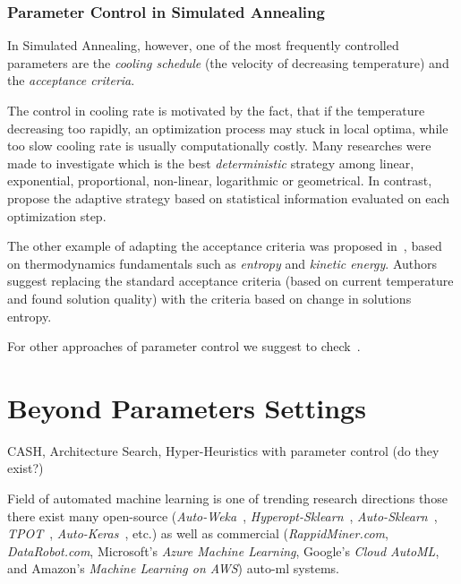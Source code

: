 \subsubsection{Parameter Control in Simulated Annealing}\label{bg: parameter control: SA}
In Simulated Annealing, however, one of the most frequently controlled parameters are the \textit{cooling schedule} (the velocity of decreasing temperature) and the \textit{acceptance criteria}.

The control in cooling rate is motivated by the fact, that if the temperature decreasing too rapidly, an optimization process may stuck in local optima, while too slow cooling rate is usually computationally costly. Many researches were made to investigate which is the best \textit{deterministic} strategy among linear, exponential, proportional, non-linear, logarithmic or geometrical. In contrast, \cite{karabin2020simulated} propose the adaptive strategy based on statistical information evaluated on each optimization step.

The other example of adapting the acceptance criteria was proposed in~\cite{ghandeshtani2019entropy}, based on thermodynamics fundamentals such as \textit{entropy} and \textit{kinetic energy}. Authors suggest replacing the standard acceptance criteria (based on current temperature and found solution quality) with the criteria based on change in solutions entropy.

For other approaches of parameter control we suggest to check~\cite{ingber2000adaptive,de2003placement}.

\section{Beyond Parameters Settings} 

CASH, Architecture Search, Hyper-Heuristics with parameter control (do they exist?)


Field of automated machine learning is one of trending research directions those there exist many open-source (\textit{Auto-Weka}~\cite{thornton2013auto}, \textit{Hyperopt-Sklearn}~\cite{komer2014hyperopt}, \textit{Auto-Sklearn}~\cite{feurer2015efficient}, \textit{TPOT}~\cite{olson2019tpot}, \textit{Auto-Keras}~\cite{jin2019auto}, etc.) as well as commercial (\textit{RappidMiner.com}, \textit{DataRobot.com}, Microsoft’s \textit{Azure Machine Learning}, Google’s \textit{Cloud AutoML}, and Amazon's \textit{Machine Learning on AWS}) auto-ml systems.







